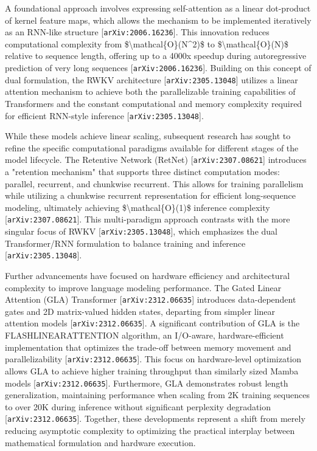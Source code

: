 \documentclass[11pt]{article}
\begin{document}
A foundational approach involves expressing self-attention as a linear dot-product of kernel feature maps, which allows the mechanism to be implemented iteratively as an RNN-like structure [\texttt{arXiv:2006.16236}]. This innovation reduces computational complexity from \$\textbackslash{}mathcal\{O\}(N\textasciicircum{}2)\$ to \$\textbackslash{}mathcal\{O\}(N)\$ relative to sequence length, offering up to a 4000x speedup during autoregressive prediction of very long sequences [\texttt{arXiv:2006.16236}]. Building on this concept of dual formulation, the RWKV architecture [\texttt{arXiv:2305.13048}] utilizes a linear attention mechanism to achieve both the parallelizable training capabilities of Transformers and the constant computational and memory complexity required for efficient RNN-style inference [\texttt{arXiv:2305.13048}].

While these models achieve linear scaling, subsequent research has sought to refine the specific computational paradigms available for different stages of the model lifecycle. The Retentive Network (RetNet) [\texttt{arXiv:2307.08621}] introduces a "retention mechanism" that supports three distinct computation modes: parallel, recurrent, and chunkwise recurrent. This allows for training parallelism while utilizing a chunkwise recurrent representation for efficient long-sequence modeling, ultimately achieving \$\textbackslash{}mathcal\{O\}(1)\$ inference complexity [\texttt{arXiv:2307.08621}]. This multi-paradigm approach contrasts with the more singular focus of RWKV [\texttt{arXiv:2305.13048}], which emphasizes the dual Transformer/RNN formulation to balance training and inference [\texttt{arXiv:2305.13048}].

Further advancements have focused on hardware efficiency and architectural complexity to improve language modeling performance. The Gated Linear Attention (GLA) Transformer [\texttt{arXiv:2312.06635}] introduces data-dependent gates and 2D matrix-valued hidden states, departing from simpler linear attention models [\texttt{arXiv:2312.06635}]. A significant contribution of GLA is the FLASHLINEARATTENTION algorithm, an I/O-aware, hardware-efficient implementation that optimizes the trade-off between memory movement and parallelizability [\texttt{arXiv:2312.06635}]. This focus on hardware-level optimization allows GLA to achieve higher training throughput than similarly sized Mamba models [\texttt{arXiv:2312.06635}]. Furthermore, GLA demonstrates robust length generalization, maintaining performance when scaling from 2K training sequences to over 20K during inference without significant perplexity degradation [\texttt{arXiv:2312.06635}]. Together, these developments represent a shift from merely reducing asymptotic complexity to optimizing the practical interplay between mathematical formulation and hardware execution.
\end{document}
